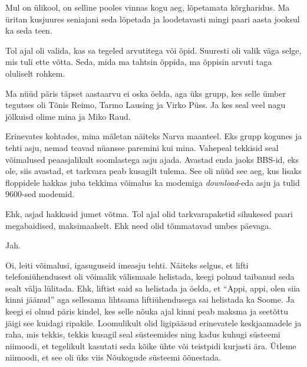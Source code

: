 
Mul on ülikool, on selline pooles vinnas kogu aeg, lõpetamata kõrgharidus. Ma üritan kusjuures seniajani seda lõpetada ja loodetavasti mingi paari aasta jooksul ka seda teen.

Tol ajal oli valida, kas sa tegeled arvutitega või õpid. Suuresti oli valik väga selge, mis tuli ette võtta. Seda, mida ma tahtsin õppida, ma õppisin arvuti taga oluliselt rohkem.
                 

Ma nüüd päris täpset aastaarvu ei oska öelda, aga üks grupp, kes selle ümber  tegutses oli Tõnis Reimo, Tarmo Lausing ja Virko Püss. Ja kes seal  veel nagu jõlkuisd olime mina ja Miko Raud.  


Erinevates kohtades, mina mäletan näiteks Narva maanteel. Eks grupp kogunes ja tehti asju, nemad teavad nüansse paremini kui mina. Vahepeal tekkisid seal võimalused  peaasjalikult soomlastega asju ajada. Avastad enda jaoks BBS-id, eks ole, siis avastad, et tarkvara peab kusagilt tulema. See oli nüüd see aeg, kus lisaks floppidele hakkas juba tekkima võimalus ka modemiga \emph{download}-eda asju ja  tulid 9600-sed modemid.

Ehk, asjad hakkasid jumet võtma. Tol ajal olid tarkvarapaketid sihukesed paari megabaidised, maksimaalselt. Ehk need olid tõmmatavad umbes päevaga.

                 
Jah. 


Oi, leiti võimalusi, igasuguseid imeasju tehti. Näiteks selgus, et lifti telefoniühendusest oli võimalik välismaale helistada, keegi polnud taibanud seda sealt välja lülitada. Ehk, liftist said sa helistada ja öelda, et \enquote{Appi, appi, olen siia kinni jäänud} aga sellesama lihtsama liftiühendusega sai helistada ka Soome. Ja keegi ei olnud päris kindel, kes selle nõuka ajal kinni peab maksma ja  seetõttu jäigi see kuidagi ripakile. Loomulikult olid ligipääsud erinevatele keskjaamadele ja raha, mis tekkis, tekkis kusagil seal süsteemides ning kadus kuhugi süsteemi niimoodi, et tegelikult kasutati seda kõike ühte või teistpidi kurjasti ära. Ütleme niimoodi, et see oli üks viis Nõukogude süsteemi õõnestada.

